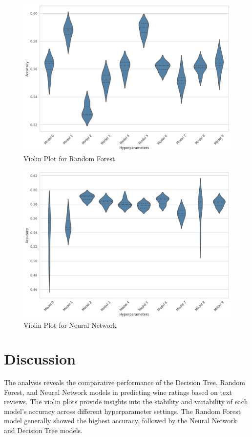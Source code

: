 \documentclass[twocolumn]{article}
\begin{document}
\begin{figure}[h!]
    \centering
    \includegraphics[width=\columnwidth]{images/violin_plot_random_forest.png}
    \caption{Violin Plot for Random Forest}
    \label{fig:random_forest_violin}
\end{figure}

\begin{figure}[h!]
    \centering
    \includegraphics[width=\columnwidth]{images/violin_plot_neural_network.png}
    \caption{Violin Plot for Neural Network}
    \label{fig:neural_network_violin}
\end{figure}

\section{Discussion}
The analysis reveals the comparative performance of the Decision Tree, Random Forest, and Neural Network models in predicting wine ratings based on text reviews. The violin plots provide insights into the stability and variability of each model's accuracy across different hyperparameter settings. The Random Forest model generally showed the highest accuracy, followed by the Neural Network and Decision Tree models.
\end{document}
